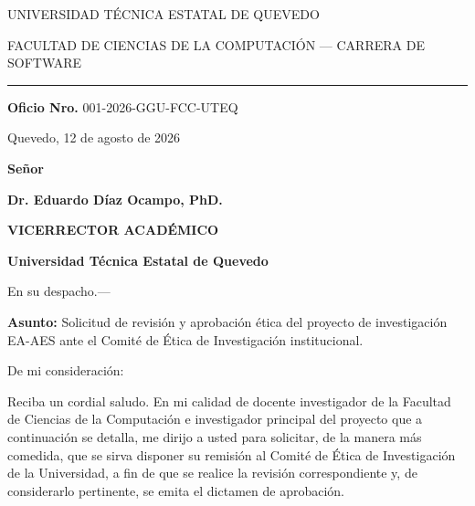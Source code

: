 \documentclass[11pt,a4paper]{article}
\begin{document}
\begin{center}
	{\sffamily\small\color{grismedio} UNIVERSIDAD T\'ECNICA ESTATAL DE QUEVEDO\par}
	{\sffamily\small\color{grismedio} FACULTAD DE CIENCIAS DE LA COMPUTACI\'ON --- CARRERA DE SOFTWARE\par}
\end{center}

\vspace{6pt}
\hrule
\vspace{10pt}

\begin{flushright}
	\textbf{Oficio Nro.} 001-2026-GGU-FCC-UTEQ

	Quevedo, 12 de agosto de 2026
\end{flushright}

\vspace{6pt}
\textbf{Se\~nor}

\textbf{Dr. Eduardo D\'iaz Ocampo, PhD.}

\textbf{VICERRECTOR ACAD\'EMICO}

\textbf{Universidad T\'ecnica Estatal de Quevedo}

En su despacho.---

\vspace{8pt}
\textbf{Asunto:} Solicitud de revisi\'on y aprobaci\'on \'etica del proyecto de investigaci\'on EA-AES ante el Comit\'e de \'Etica de Investigaci\'on institucional.

\vspace{8pt}
De mi consideraci\'on:

Reciba un cordial saludo. En mi calidad de docente investigador de la Facultad de Ciencias de la Computaci\'on e investigador principal del proyecto que a continuaci\'on se detalla, me dirijo a usted para solicitar, de la manera m\'as comedida, que se sirva disponer su remisi\'on al Comit\'e de \'Etica de Investigaci\'on de la Universidad, a fin de que se realice la revisi\'on correspondiente y, de considerarlo pertinente, se emita el dictamen de aprobaci\'on.
\end{document}
